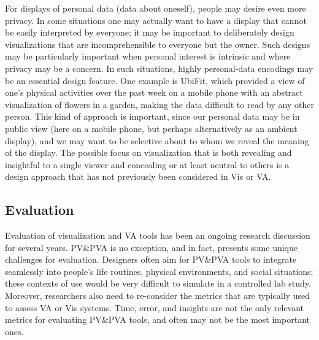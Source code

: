 \documentclass[12pt,oneside]{book}
\begin{document}
For displays of personal data (data about oneself), people may desire even more privacy.  In some situations one may actually want to have a display that cannot be easily interpreted by everyone; it may be important to deliberately design visualizations that are incomprehensible to everyone but the owner.  Such designs may be particularly important when personal interest is intrinsic and where privacy may be a concern.  In such situations, highly personal-data encodings may be an essential design feature. One example is UbiFit, which provided a view of one's physical activities over the past week on a mobile phone with an abstract visualization of flowers in a garden, making the data difficult to read by any other person.  This kind of approach is important, since our personal data may be in public view (here on a mobile phone, but perhaps alternatively as an ambient display), and we may want to be selective about to whom we reveal the meaning of the display. The possible focus on visualization that is both revealing and insightful to a single viewer and concealing or at least neutral to others is a design approach that has not previously been considered in Vis or VA.

\subsection{Evaluation}
\label{pva:evaluation}
Evaluation of visualization and VA tools has been an ongoing research discussion for several years. PV\&PVA is no exception, and in fact, presents some unique challenges for evaluation.  Designers often aim for PV\&PVA tools to integrate seamlessly into people's life routines, physical environments, and social situations; these contexts of use would be very difficult to simulate in a controlled lab study. Moreover, researchers also need to re-consider the metrics that are typically used to assess VA or Vis systems.  Time, error, and insights are not the only relevant metrics for evaluating PV\&PVA tools, and often may not be the most important ones.
\end{document}
